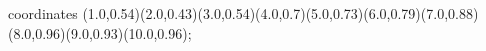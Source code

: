 					coordinates { (1.0,0.54)(2.0,0.43)(3.0,0.54)(4.0,0.7)(5.0,0.73)(6.0,0.79)(7.0,0.88)(8.0,0.96)(9.0,0.93)(10.0,0.96)};